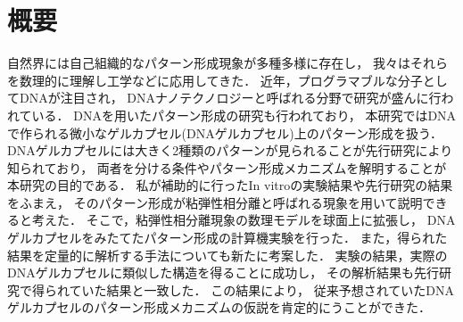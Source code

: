 \chapter*{概要}

自然界には自己組織的なパターン形成現象が多種多様に存在し，
我々はそれらを数理的に理解し工学などに応用してきた．
近年，プログラマブルな分子としてDNAが注目され，
DNAナノテクノロジーと呼ばれる分野で研究が盛んに行われている．
DNAを用いたパターン形成の研究も行われており，
本研究ではDNAで作られる微小なゲルカプセル(DNAゲルカプセル)上のパターン形成を扱う．
DNAゲルカプセルには大きく2種類のパターンが見られることが先行研究により知られており，
両者を分ける条件やパターン形成メカニズムを解明することが本研究の目的である．
私が補助的に行ったIn vitroの実験結果や先行研究の結果をふまえ，
そのパターン形成が粘弾性相分離と呼ばれる現象を用いて説明できると考えた．
そこで，粘弾性相分離現象の数理モデルを球面上に拡張し，
DNAゲルカプセルをみたてたパターン形成の計算機実験を行った．
また，得られた結果を定量的に解析する手法についても新たに考案した．
実験の結果，実際のDNAゲルカプセルに類似した構造を得ることに成功し，
その解析結果も先行研究で得られていた結果と一致した．
この結果により，
従来予想されていたDNAゲルカプセルのパターン形成メカニズムの仮説を肯定的にうことができた．
